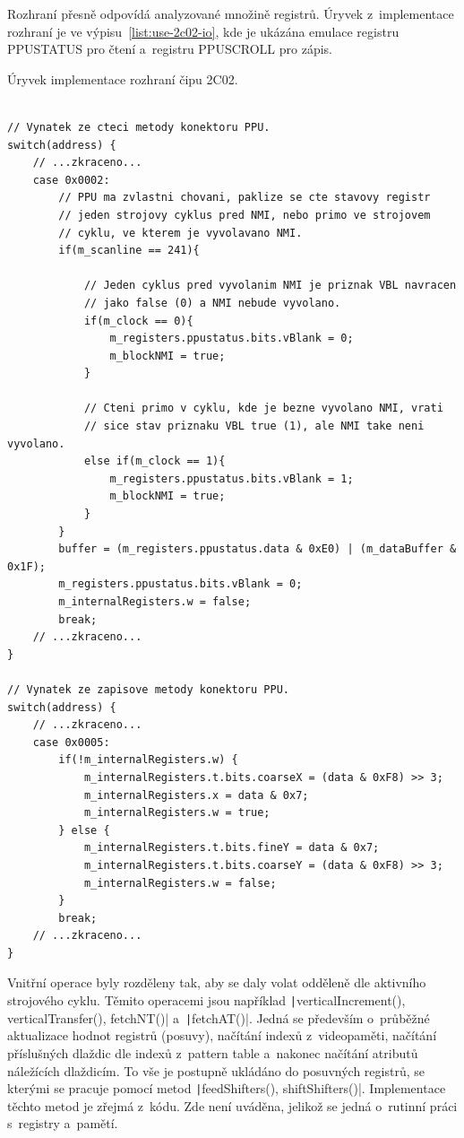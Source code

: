 Rozhraní přesně odpovídá analyzované množině registrů. Úryvek z~implementace rozhraní je ve výpisu~\ref{list:use-2c02-io}, kde je ukázána emulace registru PPUSTATUS pro čtení a~registru PPUSCROLL pro zápis.

\begin{listing}
	\caption{Úryvek implementace rozhraní čipu 2C02.}
	\label{list:use-2c02-io}
	\begin{verbatim}

// Vynatek ze cteci metody konektoru PPU.
switch(address) {
	// ...zkraceno...
	case 0x0002:
		// PPU ma zvlastni chovani, paklize se cte stavovy registr
		// jeden strojovy cyklus pred NMI, nebo primo ve strojovem
		// cyklu, ve kterem je vyvolavano NMI.
	    if(m_scanline == 241){

			// Jeden cyklus pred vyvolanim NMI je priznak VBL navracen
			// jako false (0) a NMI nebude vyvolano.
			if(m_clock == 0){
				m_registers.ppustatus.bits.vBlank = 0;
				m_blockNMI = true;
			}
			
			// Cteni primo v cyklu, kde je bezne vyvolano NMI, vrati
			// sice stav priznaku VBL true (1), ale NMI take neni vyvolano.
			else if(m_clock == 1){
				m_registers.ppustatus.bits.vBlank = 1;
				m_blockNMI = true;
			}
		}
		buffer = (m_registers.ppustatus.data & 0xE0) | (m_dataBuffer & 0x1F);
		m_registers.ppustatus.bits.vBlank = 0;
		m_internalRegisters.w = false;
		break;
	// ...zkraceno...
}

// Vynatek ze zapisove metody konektoru PPU.
switch(address) {
	// ...zkraceno...
	case 0x0005:
		if(!m_internalRegisters.w) {
			m_internalRegisters.t.bits.coarseX = (data & 0xF8) >> 3;
			m_internalRegisters.x = data & 0x7;
			m_internalRegisters.w = true;
		} else {
			m_internalRegisters.t.bits.fineY = data & 0x7;
			m_internalRegisters.t.bits.coarseY = (data & 0xF8) >> 3;
			m_internalRegisters.w = false;
		}
		break;
	// ...zkraceno...
}
	\end{verbatim}
\end{listing}

Vnitřní operace byly rozděleny tak, aby se daly volat odděleně dle aktivního strojového cyklu. Těmito operacemi jsou například \texttt|verticalIncrement(), verticalTransfer(), fetchNT()| a~\texttt|fetchAT()|. Jedná se především o~průběžné aktualizace hodnot registrů (posuvy), načítání indexů z~videopaměti, načítání příslušných dlaždic dle indexů z~pattern table a~nakonec načítání atributů náležících dlaždicím. To vše je postupně ukládáno do posuvných registrů, se kterými se pracuje pomocí metod \texttt|feedShifters(), shiftShifters()|. Implementace těchto metod je zřejmá z~kódu. Zde není uváděna, jelikož se jedná o~rutinní práci s~registry a~pamětí.

